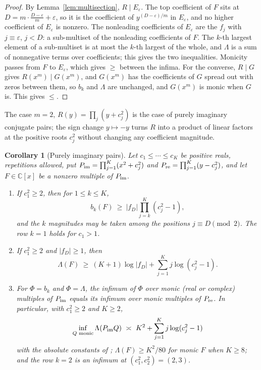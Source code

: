 \documentclass[11pt]{article}
\newtheorem{corollary}[theorem]{Corollary}
\begin{document}
\begin{proof}
By Lemma~\ref{lem:multisection}, $R\mid E_\varepsilon$.  The top coefficient
of $F$ sits at $D=m\cdot\frac{D-\varepsilon}m+\varepsilon$, so it is the
coefficient of $y^{(D-\varepsilon)/m}$ in $E_\varepsilon$, and no higher
coefficient of $E_\varepsilon$ is nonzero.  The nonleading coefficients of
$E_\varepsilon$ are the $f_j$ with $j\equiv\varepsilon$, $j<D$: a
sub-multiset of the nonleading coefficients of $F$.  The $k$-th largest
element of a sub-multiset is at most the $k$-th largest of the whole, and
$\Lambda$ is a sum of nonnegative terms over coefficients; this gives the
two inequalities.  Monicity passes from $F$ to $E_\varepsilon$, which gives
$\ge$ between the infima.  For the converse, $R\mid G$ gives
$R(x^m)\mid G(x^m)$, and $G(x^m)$ has the coefficients of $G$ spread out
with zeros between them, so $b_k$ and $\Lambda$ are unchanged, and
$G(x^m)$ is monic when $G$ is.  This gives $\le$.
\end{proof}

The case $m=2$, $R(y)=\prod_j(y+c_j^2)$ is the case of purely imaginary
conjugate pairs; the sign change $y\mapsto-y$ turns $R$ into a product of
linear factors at the positive roots $c_j^2$ without changing any
coefficient magnitude.

\begin{corollary}[Purely imaginary pairs]\label{cor:imag}
Let $c_1\le\cdots\le c_K$ be positive reals, repetitions allowed, put
$P_{\rm im}=\prod_{j=1}^K(x^2+c_j^2)$ and
$P_{\rm re}=\prod_{j=1}^K(y-c_j^2)$, and let $F\in\mathbb C[x]$ be a nonzero
multiple of $P_{\rm im}$.
\begin{enumerate}
\item If $c_1^2\ge2$, then for $1\le k\le K$,
\[
  b_k(F)\ \ge\ |f_D|\prod_{j=k}^K(c_j^2-1),
\]
and the $k$ magnitudes may be taken among the positions $j\equiv D\pmod2$.
The row $k=1$ holds for $c_1>1$.
\item If $c_1^2\ge2$ and $|f_D|\ge1$, then
\[
  \Lambda(F)\ \ge\ (K+1)\log|f_D|+\sum_{j=1}^Kj\log(c_j^2-1).
\]
\item For $\Phi=b_k$ and $\Phi=\Lambda$, the infimum of $\Phi$ over monic
(real or complex) multiples of $P_{\rm im}$ equals its infimum over monic
multiples of $P_{\rm re}$.  In particular, with $c_1^2\ge2$ and $K\ge2$,
\[
  \inf_{Q\text{ monic}}\Lambda(P_{\rm im}Q)\ \asymp\
  K^2+\sum_{j=1}^Kj\log(c_j^2-1)
\]
with the absolute constants of \cite[Corollary~4.3]{coefficient-mass};
$\Lambda(F)\ge K^2/80$ for monic $F$ when $K\ge8$; and the row $k=2$ is an
infimum at $(c_1^2,c_2^2)=(2,3)$.
\end{enumerate}
\end{corollary}
\end{document}

